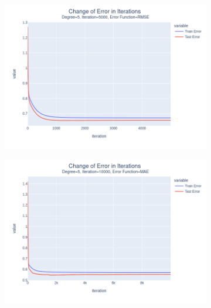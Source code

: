 \documentclass[14pt,a4]{article}
\begin{document}
\begin{figure}[h]
\begin{subfigure}{0.3\textwidth}
    \end{subfigure}
    \hfill
    \begin{subfigure}{0.3\linewidth}
        \centering
        \includegraphics[width=\textwidth]{images/implementation/q1/part_d/error/5_5000_RMSE.png}
    \end{subfigure}
    \newline
    \begin{subfigure}{0.3\linewidth}
        \centering
        \includegraphics[width=\textwidth]{images/implementation/q1/part_d/error/5_10000_MAE.png}
    \end{subfigure}
    \hfill
    \begin{subfigure}{0.3\textwidth}
        \centering

\end{subfigure}
\end{figure}
\end{document}
